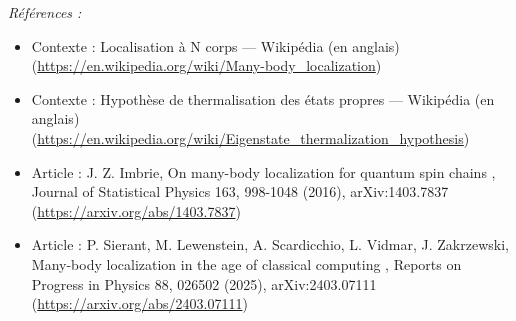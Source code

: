 \documentclass[11pt]{article}
\newenvironment{refs}{\par\small\noindent\emph{Références :}\begin{itemize}\setlength\itemsep{0pt}}{\end{itemize}\normalsize}
\begin{document}
\begin{refs}
\item Contexte : Localisation à N corps --- Wikipédia (en anglais) (\url{https://en.wikipedia.org/wiki/Many-body_localization})
\item Contexte : Hypothèse de thermalisation des états propres --- Wikipédia (en anglais) (\url{https://en.wikipedia.org/wiki/Eigenstate_thermalization_hypothesis})
\item Article : J. Z. Imbrie, \og{} On many-body localization for quantum spin chains \fg{}, Journal of Statistical Physics 163, 998-1048 (2016), arXiv:1403.7837 (\url{https://arxiv.org/abs/1403.7837})
\item Article : P. Sierant, M. Lewenstein, A. Scardicchio, L. Vidmar, J. Zakrzewski, \og{} Many-body localization in the age of classical computing \fg{}, Reports on Progress in Physics 88, 026502 (2025), arXiv:2403.07111 (\url{https://arxiv.org/abs/2403.07111})
\end{refs}

\bigskip
\end{document}

